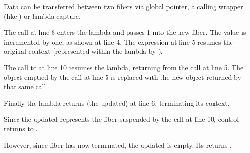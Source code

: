 
Data can be transferred between two fibers via global pointer, a calling
wrapper (like ) or lambda capture.

The \resume call at line 8 enters the lambda and passes 1 into the
new fiber. The value is incremented by one, as shown at line 4. The expression
 at line 5 resumes the original context (represented
within the lambda by ).

The call to  at line 10 resumes the lambda, returning from
the  call at line 5. The \fiber object 
emptied by the \resume call at line 5 is replaced with the new object
returned by that same \resume call.

Finally the lambda returns (the updated)  at line 6, terminating its
context.

Since the updated  represents the fiber suspended by the call at
line 10, control returns to \main.

However, since fiber  has now terminated, the updated 
is empty. Its \opbool returns \false.

